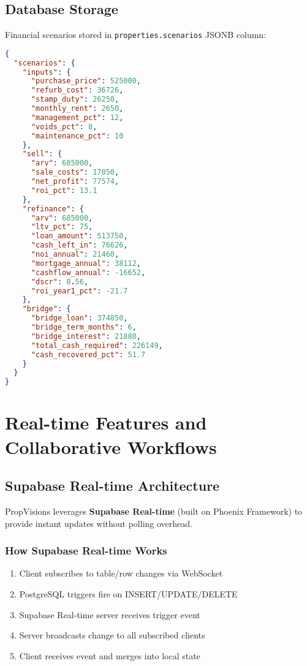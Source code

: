 \documentclass[11pt,a4paper]{article}
\begin{document}
\subsection{Database Storage}

Financial scenarios stored in \texttt{properties.scenarios} JSONB column:

\begin{lstlisting}[language=JSON, caption=Scenarios Structure]
{
  "scenarios": {
    "inputs": {
      "purchase_price": 525000,
      "refurb_cost": 36726,
      "stamp_duty": 26250,
      "monthly_rent": 2650,
      "management_pct": 12,
      "voids_pct": 8,
      "maintenance_pct": 10
    },
    "sell": {
      "arv": 685000,
      "sale_costs": 17050,
      "net_profit": 77574,
      "roi_pct": 13.1
    },
    "refinance": {
      "arv": 685000,
      "ltv_pct": 75,
      "loan_amount": 513750,
      "cash_left_in": 76626,
      "noi_annual": 21460,
      "mortgage_annual": 38112,
      "cashflow_annual": -16652,
      "dscr": 0.56,
      "roi_year1_pct": -21.7
    },
    "bridge": {
      "bridge_loan": 374850,
      "bridge_term_months": 6,
      "bridge_interest": 21880,
      "total_cash_required": 226149,
      "cash_recovered_pct": 51.7
    }
  }
}
\end{lstlisting}

\section{Real-time Features and Collaborative Workflows}

\subsection{Supabase Real-time Architecture}

PropVisions leverages \textbf{Supabase Real-time} (built on Phoenix Framework) to provide instant updates without polling overhead.

\subsubsection{How Supabase Real-time Works}

\begin{enumerate}
  \item Client subscribes to table/row changes via WebSocket
  \item PostgreSQL triggers fire on INSERT/UPDATE/DELETE
  \item Supabase Real-time server receives trigger event
  \item Server broadcasts change to all subscribed clients
  \item Client receives event and merges into local state
\end{enumerate}
\end{document}
